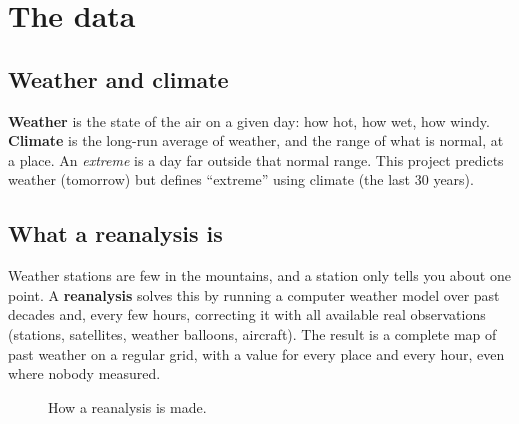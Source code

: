\chapter{The data}
\label{ch:data}

\section{Weather and climate}
\textbf{Weather} is the state of the air on a given day: how hot, how wet, how windy. \textbf{Climate} is the long-run
average of weather, and the range of what is normal, at a place. An \emph{extreme} is a day far outside that normal
range. This project predicts weather (tomorrow) but defines ``extreme'' using climate (the last 30 years).

\section{What a reanalysis is}
Weather stations are few in the mountains, and a station only tells you about one point. A \textbf{reanalysis} solves
this by running a computer weather model over past decades and, every few hours, correcting it with all available real
observations (stations, satellites, weather balloons, aircraft). The result is a complete map of past weather on a
regular grid, with a value for every place and every hour, even where nobody measured.

\begin{figure}[H]
\centering
{}
\caption{How a reanalysis is made.}
\end{figure}

